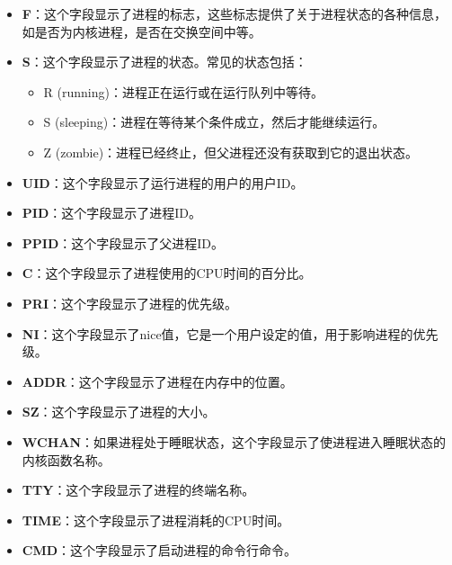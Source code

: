 \documentclass{ctexart}
\begin{document}
\begin{itemize}  
\item \textbf{F}：这个字段显示了进程的标志，这些标志提供了关于进程状态的各种信息，如是否为内核进程，是否在交换空间中等。  
  
\item \textbf{S}：这个字段显示了进程的状态。常见的状态包括：  
  \begin{itemize}  
  \item R (running)：进程正在运行或在运行队列中等待。  
  \item S (sleeping)：进程在等待某个条件成立，然后才能继续运行。  
  \item Z (zombie)：进程已经终止，但父进程还没有获取到它的退出状态。  
  \end{itemize}  
  
\item \textbf{UID}：这个字段显示了运行进程的用户的用户ID。  
  
\item \textbf{PID}：这个字段显示了进程ID。  
  
\item \textbf{PPID}：这个字段显示了父进程ID。  
  
\item \textbf{C}：这个字段显示了进程使用的CPU时间的百分比。  
  
\item \textbf{PRI}：这个字段显示了进程的优先级。  
  
\item \textbf{NI}：这个字段显示了nice值，它是一个用户设定的值，用于影响进程的优先级。  
  
\item \textbf{ADDR}：这个字段显示了进程在内存中的位置。  
  
\item \textbf{SZ}：这个字段显示了进程的大小。  
  
\item \textbf{WCHAN}：如果进程处于睡眠状态，这个字段显示了使进程进入睡眠状态的内核函数名称。  
  
\item \textbf{TTY}：这个字段显示了进程的终端名称。  
  
\item \textbf{TIME}：这个字段显示了进程消耗的CPU时间。  
  
\item \textbf{CMD}：这个字段显示了启动进程的命令行命令。  
\end{itemize} 
\end{document}
